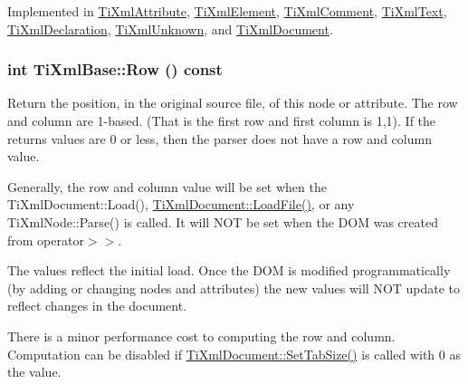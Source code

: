 Implemented in \hyperlink{class_ti_xml_attribute_acc04956c1d5c4c31fe74f7a7528d109a}{TiXmlAttribute}, \hyperlink{class_ti_xml_element_afbf52736e70fc91ec9d760721d6f4fd2}{TiXmlElement}, \hyperlink{class_ti_xml_comment_a6b316527aaa8da0370cd68c22a5a0f5f}{TiXmlComment}, \hyperlink{class_ti_xml_text_a0cafbf6f236c7f02d12b2bffc2b7976b}{TiXmlText}, \hyperlink{class_ti_xml_declaration_abf6303db4bd05b5be554036817ff1cb4}{TiXmlDeclaration}, \hyperlink{class_ti_xml_unknown_a31ba089a40fb5a1869750fce09b0bacb}{TiXmlUnknown}, and \hyperlink{class_ti_xml_document_a8701fda1fa31b25abbc9c0df42da10e8}{TiXmlDocument}.\hypertarget{class_ti_xml_base_a024bceb070188df92c2a8d8852dd0853}{
\subsubsection[{Row}]{\setlength{\rightskip}{0pt plus 5cm}int TiXmlBase::Row () const}}
\label{class_ti_xml_base_a024bceb070188df92c2a8d8852dd0853}
Return the position, in the original source file, of this node or attribute. The row and column are 1-\/based. (That is the first row and first column is 1,1). If the returns values are 0 or less, then the parser does not have a row and column value.

Generally, the row and column value will be set when the TiXmlDocument::Load(), \hyperlink{class_ti_xml_document_a4c852a889c02cf251117fd1d9fe1845f}{TiXmlDocument::LoadFile()}, or any TiXmlNode::Parse() is called. It will NOT be set when the DOM was created from operator$>$$>$.

The values reflect the initial load. Once the DOM is modified programmatically (by adding or changing nodes and attributes) the new values will NOT update to reflect changes in the document.

There is a minor performance cost to computing the row and column. Computation can be disabled if \hyperlink{class_ti_xml_document_a51dac56316f89b35bdb7d0d433ba988e}{TiXmlDocument::SetTabSize()} is called with 0 as the value.

